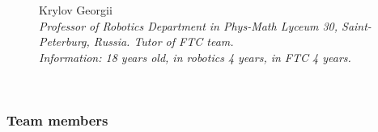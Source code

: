 \begin{figure}[H]
	\begin{minipage}{0.47\linewidth}
		Krylov Georgii \\ 
		\emph{Professor of Robotics Department in Phys-Math Lyceum 30, Saint-Peterburg, Russia. Tutor of FTC team. \\}
		\emph{Information: 18 years old, in robotics 4 years, in FTC 4 years.}
	\end{minipage}	
	\hfill
	\begin{minipage}[h]{0.47\linewidth}
		\\
	\end{minipage}
	\vfill 
\end{figure}

\fillpage

\subsubsection{Team members}

